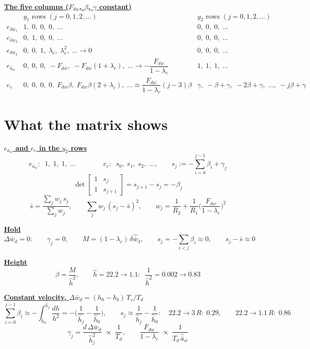 \documentclass[11pt,a4paper]{ctexart}
\newcommand{\lc}{\lambda_c}
\newcommand{\ba}{\bar{a}}
\newcommand{\bw}{\bar{w}}
\newcommand{\dW}{\Delta\bw}
\newcommand{\ah}{\hat{\ba}_w}
\newcommand{\wh}{\hat{\bw}}
\newcommand{\hh}{\hat{h}}
\newcommand{\hd}[1]{\par\bigskip\noindent\underline{\textbf{#1}}}
\begin{document}
\hd{The five columns ($F_{dw}$, $\beta$, $\gamma$ constant)}
{\small
\[
\begin{array}{c|l|l}
 & y_1 \text{ rows } (j = 0, 1, 2, \dots) & y_2 \text{ rows } (j = 0, 1, 2, \dots) \\ \hline
e_{\delta\bw_1} & 1,\; 0,\; 0,\; 0,\; \dots & 0,\; 0,\; 0,\; \dots \\
e_{\delta\bw_2} & 0,\; 1,\; 0,\; 0,\; \dots & 0,\; 0,\; 0,\; \dots \\
e_{\delta\bw_3} & 0,\; 0,\; 1,\; \lc,\; \lc^2,\; \dots \to 0 & 0,\; 0,\; 0,\; \dots \\
e_{\ba_w} & 0,\; 0,\; 0,\; -F_{dw},\; -F_{dw}(1+\lc),\; \dots \to -\dfrac{F_{dw}}{1-\lc} & 1,\; 1,\; 1,\; \dots \\[1.2ex]
e_c & 0,\; 0,\; 0,\; 0,\; F_{dw}\beta,\; F_{dw}\beta(2+\lc),\; \dots \approx \dfrac{F_{dw}}{1-\lc}(j-3)\beta & \gamma,\; -\beta+\gamma,\; -2\beta+\gamma,\; \dots,\; -j\beta+\gamma
\end{array}
\]
}

\clearpage
\section{What the matrix shows}

\hd{$e_{\ba_w}$ and $e_c$ in the $y_2$ rows}
\[
e_{\ba_w}:\;\; 1,\; 1,\; 1,\; \dots \qquad\qquad
e_c:\;\; s_0,\; s_1,\; s_2,\; \dots, \qquad s_j := -\sum_{i=0}^{j-1}\beta_i + \gamma_j
\]
\[
\det\begin{bmatrix} 1 & s_j \\ 1 & s_{j+1} \end{bmatrix} = s_{j+1} - s_j = -\beta_j
\]
\[
\bar s = \frac{\sum_j w_j\, s_j}{\sum_j w_j}, \qquad
\sum_j w_j\,(s_j - \bar s)^2, \qquad
w_j = \frac{1}{R_2} + \frac{1}{R_1}\Big(\frac{F_{dw}}{1-\lc}\Big)^{2}
\]

\hd{Hold}
\[
\dW_d = 0:\qquad \gamma_j = 0, \qquad M = (1-\lc)\,\delta\wh_3, \qquad
s_j = -\sum_{i<j}\beta_i \approx 0, \qquad s_j - \bar s \approx 0
\]

\hd{Height}
\[
\beta = \frac{M}{\hh^{2}}, \qquad \hh = 22.2 \to 1.1:\;\; \frac{1}{\hh^{2}} = 0.002 \to 0.83
\]

\hd{Constant velocity, $\dW_d = (h_0 - h_b)\,T_s/T_d$}
\[
\sum_{i=0}^{j-1}\beta_i \approx -\int_{\hh_0}^{\hh_j}\frac{dh}{h^{2}} = -\Big(\frac{1}{\hh_j} - \frac{1}{\hh_0}\Big), \qquad
s_j \approx \frac{1}{\hh_j} - \frac{1}{\hh_0}:\quad 22.2 \to 3\,R:\; 0.29, \qquad 22.2 \to 1.1\,R:\; 0.86
\]
\[
\gamma_j = \frac{d\,\dW_d}{\hh_j^{2}} \;\propto\; \frac{1}{T_d}, \qquad
\frac{F_{dw}}{1-\lc} \;\propto\; \frac{1}{T_d\,\ah}
\]
\end{document}

